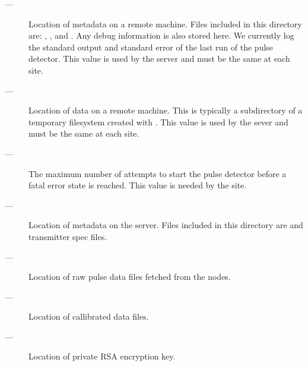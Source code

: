 \documentclass[letter]{article}
\begin{document}
\begin{description}
  \item[\quad {} ---] Location of metadata on a remote 
   machine. Files included in this directory are: , , 
   and . Any debug information is also stored here. We currently 
   log the standard output and standard error of the last run of the pulse detector. 
   This value is used by the server and must be the same at each site. 

  \item[\quad {} ---] Location of data on a remote machine. 
   This is typically a subdirectory of a temporary filesystem created with 
   . This value is used by the sever and must be the same at 
   each site. 
  
  \item[\quad {} ---] The maximum number of attempts to start the 
   pulse detector before a fatal error state is reached. This value is needed 
   by the site. 
   
  \item[\quad {} ---] Location of metadata on the 
   server. Files included in this directory are  and transmitter
   spec files.

  \item[\quad {} ---] Location of raw pulse data files 
   fetched from the nodes.
  
  \item[\quad {} ---] Location of callibrated data files. 
  
  \item[\quad {} ---] Location of private RSA encryption
   key. 
  
\end{description}
\end{document}
